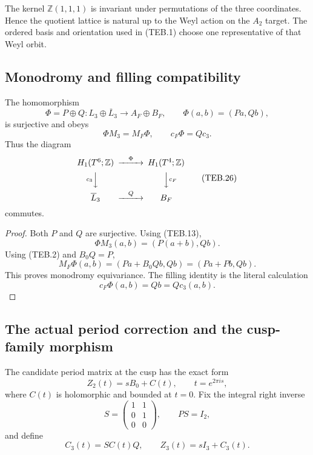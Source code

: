 The kernel \(\mathbb Z(1,1,1)\) is invariant under permutations of the three
coordinates.  Hence the quotient lattice is natural up to the Weyl action on
the \(A_2\) target.  The ordered basis and orientation used in (TEB.1) choose
one representative of that Weyl orbit.

\subsection{Monodromy and filling compatibility}
\label{subsec:teb-mono-filling}

\begin{theorem}
\label{thm:teb-local-lattice-bridge}
The homomorphism
\[
 \Phi=P\oplus Q:L_3\oplus\overline L_3
 \longrightarrow A_F\oplus B_F,
 \qquad \Phi(a,b)=(Pa,Qb),
 \tag{TEB.24}
\]
is surjective and obeys
\[
 \Phi M_3=M_F\Phi,
 \qquad c_F\Phi=Qc_3.                                  \tag{TEB.25}
\]
Thus the diagram
\[
\begin{CD}
H_1(T^6;\mathbb Z) @>{\Phi}>> H_1(T^4;\mathbb Z)\\
@V{c_3}VV @VV{c_F}V\\
\overline L_3 @>{Q}>> B_F
\end{CD}
\tag{TEB.26}
\]
commutes.
\end{theorem}

\begin{proof}
Both \(P\) and \(Q\) are surjective.  Using (TEB.13),
\[
 \Phi M_3(a,b)=(P(a+b),Qb).
\]
Using (TEB.2) and \(B_0Q=P\),
\[
 M_F\Phi(a,b)=(Pa+B_0Qb,Qb)=(Pa+Pb,Qb).
\]
This proves monodromy equivariance.  The filling identity is the literal
calculation
\[
 c_F\Phi(a,b)=Qb=Qc_3(a,b).
\]
\end{proof}

\subsection{The actual period correction and the cusp-family morphism}
\label{subsec:teb-period-lift}

The candidate period matrix at the cusp has the exact form
\[
 Z_2(t)=sB_0+C(t),
 \qquad t=e^{2\pi i s},
 \tag{TEB.27}
\]
where \(C(t)\) is holomorphic and bounded at \(t=0\).  Fix the integral right
inverse
\[
 S=\begin{pmatrix}1&1\\0&1\\0&0\end{pmatrix},
 \qquad PS=I_2,
 \tag{TEB.28}
\]
and define
\[
 C_3(t)=S C(t)Q,
 \qquad Z_3(t)=sI_3+C_3(t).
 \tag{TEB.29}
\]

